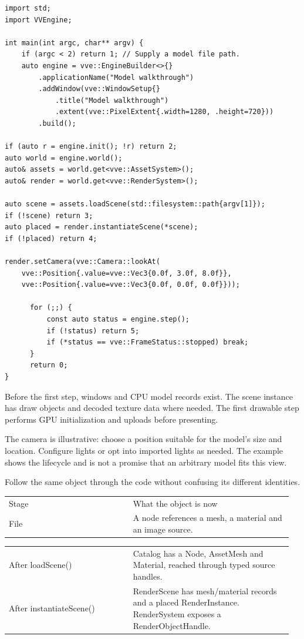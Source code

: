 \documentclass[11pt,a4paper]{article}
\begin{document}
\begin{lstlisting}[language={}]
import std;
import VVEngine;

int main(int argc, char** argv) {
    if (argc < 2) return 1; // Supply a model file path.
    auto engine = vve::EngineBuilder<>{}
        .applicationName("Model walkthrough")
        .addWindow(vve::WindowSetup{}
            .title("Model walkthrough")
            .extent(vve::PixelExtent{.width=1280, .height=720}))
        .build();

if (auto r = engine.init(); !r) return 2;
auto world = engine.world();
auto& assets = world.get<vve::AssetSystem>();
auto& render = world.get<vve::RenderSystem>();

auto scene = assets.loadScene(std::filesystem::path{argv[1]});
if (!scene) return 3;
auto placed = render.instantiateScene(*scene);
if (!placed) return 4;

render.setCamera(vve::Camera::lookAt(
    vve::Position{.value=vve::Vec3{0.0f, 3.0f, 8.0f}},
    vve::Position{.value=vve::Vec3{0.0f, 0.0f, 0.0f}}));

      for (;;) {
          const auto status = engine.step();
          if (!status) return 5;
          if (*status == vve::FrameStatus::stopped) break;
      }
      return 0;
}
\end{lstlisting}

Before the first step, windows and CPU model records exist. The scene instance has draw objects and decoded texture data where needed. The first drawable step performs GPU initialization and uploads before presenting.

The camera is illustrative: choose a position suitable for the model's size and location. Configure lights or opt into imported lights as needed. The example shows the lifecycle and is not a promise that an arbitrary model fits this view.

\label{core-47}
Follow the same object through the code without confusing its different identities.

{\small
\begin{longtable}{@{}p{0.42\linewidth}p{0.54\linewidth}@{}}
Stage & What the object is now \\
File & A node references a mesh, a material and an image source. \\
\end{longtable}
}

{\small
\begin{longtable}{@{}p{0.42\linewidth}p{0.54\linewidth}@{}}
After loadScene() & Catalog has a Node, AssetMesh and Material, reached through typed source handles. \\
After instantiateScene() & RenderScene has mesh/material records and a placed RenderInstance. RenderSystem exposes a RenderObjectHandle. \\
\end{longtable}
}
\end{document}
